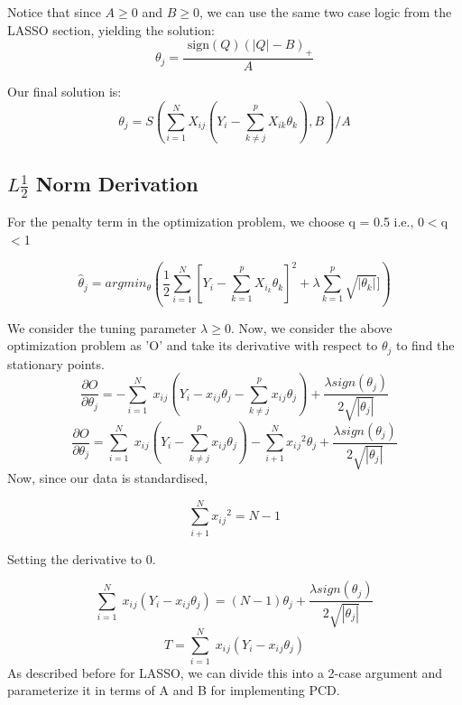 \documentclass[11pt]{article}
\newcommand{\sgn}{\text{ sign}}
\begin{document}
Notice that since $A \geq 0$ and $B \geq 0$, we can use the same two case logic from the LASSO section, yielding the solution:
	$$\theta_j = \frac{\sgn(Q)(|Q|-B)_+}{A}$$

Our final solution is:
	$$\theta_j = S\left(\sum\limits_{i=1}^N X_{ij}(Y_i - \sum\limits_{k \ne j}^p X_{ik}\theta_k), B\right)/A$$

\subsection{$L\frac{1}{2}$ Norm Derivation}
For the penalty term in the optimization problem, we choose q = 0.5 i.e., 0$<$q$<$1

\begin{equation}
\hat{\theta}_j = argmin_{\theta} {( \frac{1}{2} \sum_{i=1}^{N}[Y_i - \sum_{k=1}^{p} X_{i_k}\theta_k]^2 + \lambda \sum_{k=1}^p \sqrt{|\theta_k|}])}
\end{equation}

We consider the tuning parameter $\lambda\geq$0. Now, we consider the above optimization problem as 'O' and take its derivative with respect to $\theta_j$ to find the stationary points. 
\begin{equation}
\frac{\partial O}{\partial \theta_j} = - {\sum}_{i=1}^{N} \; x_i{_j}(Y_i - x_i{_j}\theta_j - {\sum}_{k\neq j}^{p} x_i{_j}\theta_j) + \frac{\lambda sign(\theta_j)}{2 \sqrt{|\theta_j|}}
\end{equation}
\begin{equation}
\frac{\partial O}{\partial \theta_j} = {\sum}_{i=1}^{N} \; x_i{_j}(Y_i - {\sum}_{k\neq j}^{p} x_i{_j}\theta_j) - {\sum}_{i+1}^{N} x_i{_j}^2\theta_j + \frac{\lambda sign(\theta_j)}{2 \sqrt{|\theta_j|}}
\end{equation}
Now, since our data is standardised, 

\begin{equation}
{\sum}_{i+1}^{N} x_i{_j}^2 = N-1
\end{equation}

Setting the derivative to 0. 

\begin{equation}
{\sum}_{i=1}^{N} \; x_i{_j}(Y_i - x_i{_j}\theta_j) = (N-1)\theta_j + \frac{\lambda sign(\theta_j)}{2 \sqrt{|\theta_j|}}
\end{equation}
\begin{equation}
T = {\sum}_{i=1}^{N} \; x_i{_j}(Y_i - x_i{_j}\theta_j)
\end{equation}
As described before for LASSO, we can divide this into a 2-case argument and parameterize it in terms of A and B for implementing PCD. 
\end{document}
